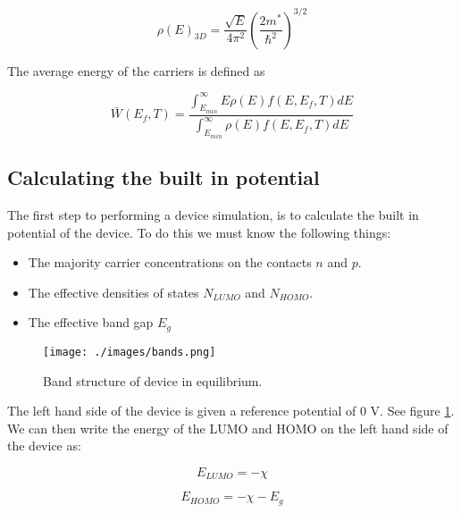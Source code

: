 \begin{equation}
\rho(E)_{3D}=\frac{\sqrt{E}}{4\pi^2} \left ( \frac{2m^{*}}{\hbar^2}\right )^{3/2}
\end{equation}

The average energy of the carriers is defined as

\begin{equation}
\label{eq:energy}
\bar{W}(E_{f},T)=\frac{\int^{\infty}_{E_{min}} E \rho(E) f(E,E_{f},T) dE}{\int^{\infty}_{E_{min}} \rho(E) f(E,E_{f},T) dE}
\end{equation}










\subsection{Calculating the built in potential}  \label{sssec:initial}
The first step to performing a device simulation, is to calculate the built in potential of the device.  To do this we must know the following things:

\begin{itemize}

  \item The majority carrier concentrations on the contacts $n$ and $p$.
  \item The effective densities of states $N_{LUMO}$ and $N_{HOMO}$.
  \item The effective band gap $E_g$

\end{itemize}

\begin{figure}[H]
\centering
\texttt{[image: ./images/bands.png]}
\caption{Band structure of device in equilibrium.}
\label{fig:bands}
\end{figure}

\vspace{1em}
The left hand side of the device is given a reference potential of 0 V.  See figure \ref{fig:bands}.  We can then write the energy of the LUMO and HOMO on the left hand side of the device as:

\begin{equation}
E_{LUMO}=-\chi
\end{equation}

\begin{equation}
E_{HOMO}=-\chi-E_{g}
\end{equation}

